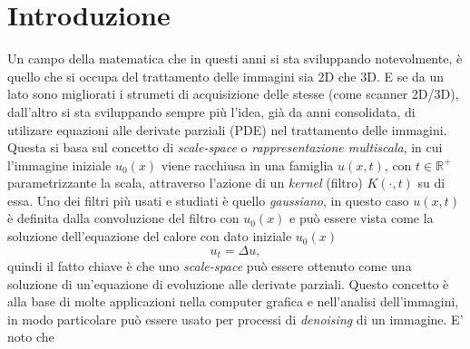\chapter*{Introduzione}
{}

Un campo della matematica che in questi anni si sta sviluppando
notevolmente, è quello che si occupa del trattamento delle immagini
sia 2D che 3D. E se da un lato sono migliorati i strumeti di
acquisizione delle stesse (come  scanner 2D/3D), dall'altro si sta
sviluppando sempre più l'idea, già da anni consolidata, di utilizare
equazioni alle derivate parziali (PDE) nel trattamento delle
immagini. Questa si basa sul concetto di \emph{scale-space} o
\emph{rappresentazione multiscala}, in cui l'immagine
iniziale $u_0(x)$ viene racchiusa in una famiglia $u(x,t)$, con
$t\in\mathbb{R}^+$ parametrizzante la scala, attraverso l'azione di un
\emph{kernel} (filtro) $K(\cdot,t)$ su di essa. Uno dei filtri più
usati  e studiati è quello \emph{gaussiano}, in questo caso  $u(x,t)$
è definita dalla convoluzione del filtro con $u_0(x)$ e può essere
vista come la soluzione dell'equazione del calore con dato iniziale $u_0(x)$
\[
u_t=\Delta u,
\]
quindi il fatto chiave è che uno \emph{scale-space} può essere
ottenuto come una soluzione di un'equazione di evoluzione alle
derivate parziali. 
Questo concetto è alla base di molte applicazioni nella computer
grafica e nell'analisi dell'immagini, in modo particolare può essere
usato per processi di \emph{denoising} di un immagine. E' noto che
